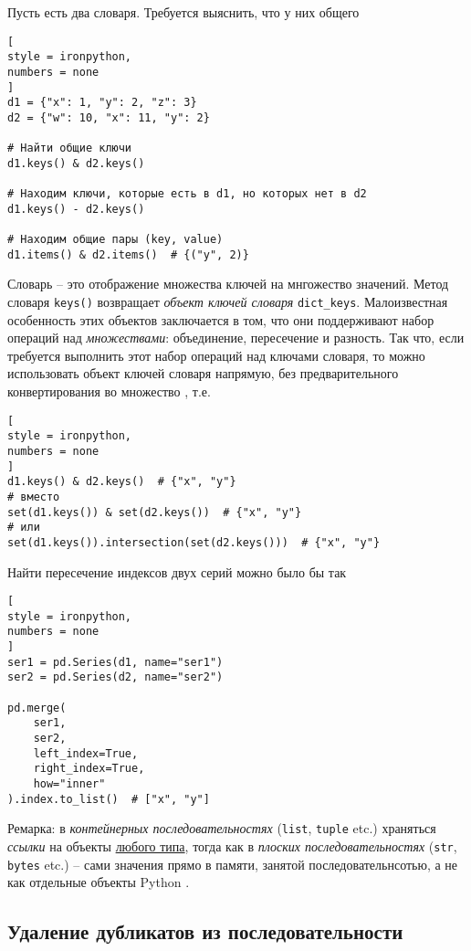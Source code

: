 \documentclass[%
	11pt,
	a4paper,
	utf8,
		]{article}
\begin{document}
Пусть есть два словаря. Требуется выяснить, что у них общего
\begin{lstlisting}[
style = ironpython,
numbers = none
]
d1 = {"x": 1, "y": 2, "z": 3}
d2 = {"w": 10, "x": 11, "y": 2}

# Найти общие ключи
d1.keys() & d2.keys()

# Находим ключи, которые есть в d1, но которых нет в d2
d1.keys() - d2.keys()

# Находим общие пары (key, value)
d1.items() & d2.items()  # {("y", 2)}
\end{lstlisting}

Словарь -- это отображение множества ключей на мнгожество значений. Метод словаря \texttt{keys()} возвращает \emph{объект ключей словаря} \texttt{dict\_keys}. Малоизвестная особенность этих объектов заключается в том, что они поддерживают набор операций над \emph{множествами}: объединение, пересечение и разность. Так что, если требуется выполнить этот набор операций над ключами словаря, то можно использовать объект ключей словаря напрямую, без предварительного конвертирования во множество \cite[]{beazley:python_cookbook-2019}, т.е.
\begin{lstlisting}[
style = ironpython,
numbers = none
]
d1.keys() & d2.keys()  # {"x", "y"}
# вместо
set(d1.keys()) & set(d2.keys())  # {"x", "y"}
# или
set(d1.keys()).intersection(set(d2.keys()))  # {"x", "y"}
\end{lstlisting}

Найти пересечение индексов двух серий можно было бы так
\begin{lstlisting}[
style = ironpython,
numbers = none
]
ser1 = pd.Series(d1, name="ser1")
ser2 = pd.Series(d2, name="ser2")

pd.merge(
    ser1,
    ser2,
    left_index=True,
    right_index=True,
    how="inner"
).index.to_list()  # ["x", "y"]
\end{lstlisting}

Ремарка: в \emph{контейнерных последовательностях} (\verb|list|, \verb*|tuple| etc.) храняться \emph{ссылки} на объекты \underline{любого типа}, тогда как в \emph{плоских последовательностях} (\verb|str|, \verb*|bytes| etc.) -- сами значения прямо в памяти, занятой последовательнсотью, а не как отдельные объекты Python \cite[]{ramalho:python-2022}.

\subsection{Удаление дубликатов из последовательности}
\end{document}
